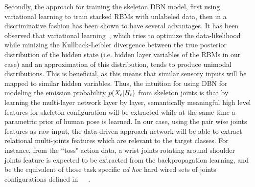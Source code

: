 Secondly, the approach for training the skeleton DBN model, first using variational learning to train stacked RBMs with unlabeled data, then in a discriminative fashion
\cite{salakhutdinov2009learning} has been shown to have several advantages.
%
It has been observed that  variational learning~\cite{hinton2006fast},
which tries to optimize the data-likelihood while minizing the Kullback-Leibler divergence between
the true posterior distribution of the hidden state (i.e. hidden layer variables of the RBMs  in our case)
and an approximation of this distribution, tends to produce unimodal distributions.
%
This is beneficial, as this means that similar sensory inputs will be mapped to  similar hidden variables.
%
Thus, the intuition for using DBN  for modeling the emission probability $p(X_t|H_t)$
from skeleton joints  is that by learning the multi-layer network layer by layer,
semantically meaningful high level features for skeleton configuration will be extracted while at the same
time a  parametric prior of human pose is learned.
%
%
In our case, using the pair wise joints features as raw input, the data-driven approach network will be able to extract relational
multi-joints features which are relevant to the target classes.
For instance, from  the ``toss" action data, a wrist joints rotating around shoulder joints feature is expected to
be extracted from the backpropagation  learning, and be the equivalent of those task specific \emph{ad hoc} hard wired sets
of joints configurations defined in~\cite{chaudhry2013bio}~\cite{muller2006motion}\cite{nowozin2012action}~\cite{ofli2013sequence}.

